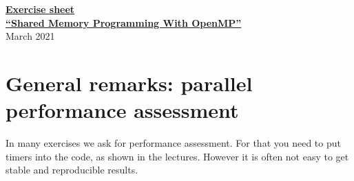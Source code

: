 \documentclass[a4paper,oneside,12pt]{article}
\begin{document}
\thispagestyle{empty}

\begin{center}
  \underline{\large \bf Exercise sheet}\\\vspace{0.2cm}
  \underline{\large \bf ``Shared Memory Programming With OpenMP''}\\[2ex]
  {\Large March 2021}
  \vspace{0.5cm}
\end{center}

\section*{General remarks: parallel performance assessment}

In many exercises we ask for performance assessment.  For that you need to put timers into the code, as shown in the lectures.  However it is often not easy to get stable and reproducible results.
\end{document}
